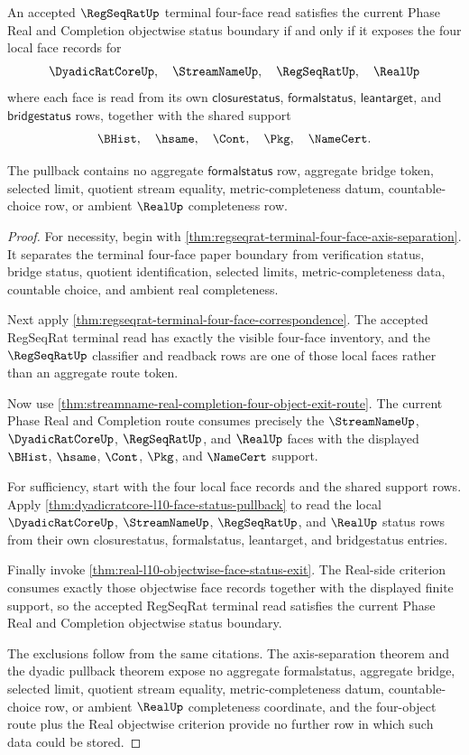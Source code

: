 \begin{theorem}
\label{thm:regseqrat-terminal-four-face-status-pullback}
An accepted $\RegSeqRatUp$ terminal four-face read satisfies the current Phase Real and Completion objectwise status boundary if and only if it exposes the four local face records for
$$
\DyadicRatCoreUp,\quad \StreamNameUp,\quad \RegSeqRatUp,\quad \RealUp
$$
where each face is read from its own $\mathsf{closurestatus}$, $\mathsf{formalstatus}$, $\mathsf{leantarget}$, and $\mathsf{bridgestatus}$ rows, together with the shared support
$$
\BHist,\quad \hsame,\quad \Cont,\quad \Pkg,\quad \NameCert.
$$

The pullback contains no aggregate $\mathsf{formalstatus}$ row, aggregate bridge token, selected limit, quotient stream equality, metric-completeness datum, countable-choice row, or ambient $\RealUp$ completeness row.
\end{theorem}
\begin{proof}
For necessity, begin with \autoref{thm:regseqrat-terminal-four-face-axis-separation}. It separates the terminal four-face paper boundary from verification status, bridge status, quotient identification, selected limits, metric-completeness data, countable choice, and ambient real completeness.

Next apply \autoref{thm:regseqrat-terminal-four-face-correspondence}. The accepted RegSeqRat terminal read has exactly the visible four-face inventory, and the $\RegSeqRatUp$ classifier and readback rows are one of those local faces rather than an aggregate route token.

Now use \autoref{thm:streamname-real-completion-four-object-exit-route}. The current Phase Real and Completion route consumes precisely the $\StreamNameUp$, $\DyadicRatCoreUp$, $\RegSeqRatUp$, and $\RealUp$ faces with the displayed $\BHist$, $\hsame$, $\Cont$, $\Pkg$, and $\NameCert$ support.

For sufficiency, start with the four local face records and the shared support rows. Apply \autoref{thm:dyadicratcore-l10-face-status-pullback} to read the local $\DyadicRatCoreUp$, $\StreamNameUp$, $\RegSeqRatUp$, and $\RealUp$ status rows from their own closurestatus, formalstatus, leantarget, and bridgestatus entries.

Finally invoke \autoref{thm:real-l10-objectwise-face-status-exit}. The Real-side criterion consumes exactly those objectwise face records together with the displayed finite support, so the accepted RegSeqRat terminal read satisfies the current Phase Real and Completion objectwise status boundary.

The exclusions follow from the same citations. The axis-separation theorem and the dyadic pullback theorem expose no aggregate formalstatus, aggregate bridge, selected limit, quotient stream equality, metric-completeness datum, countable-choice row, or ambient $\RealUp$ completeness coordinate, and the four-object route plus the Real objectwise criterion provide no further row in which such data could be stored.
\end{proof}

